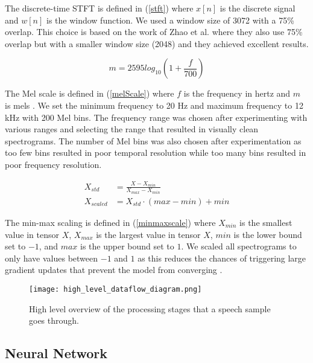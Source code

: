 The discrete-time STFT is defined in (\ref{stft}) where $x[n]$ is the discrete signal and $w[n]$ is the window function. We used a window size of 3072 with a 75\% overlap. This choice is based on the work of Zhao et al. \cite{Zhao2019} where they also use 75\% overlap but with a smaller window size (2048) and they achieved excellent results. 

\begin{equation}
\label{melScale}
m = 2595 log_{10}(1 + \frac{f}{700})
\end{equation}

The Mel scale is defined in (\ref{melScale}) where $f$ is the frequency in hertz and $m$ is mels \cite{Oshaughnessy1990}. We set the minimum frequency to 20 Hz and maximum frequency to 12 kHz with 200 Mel bins. The frequency range was chosen after experimenting with various ranges and selecting the range that resulted in visually clean spectrograms. The number of Mel bins was also chosen after experimentation as too few bins resulted in poor temporal resolution while too many bins resulted in poor frequency resolution.

\begin{equation}
\label{minmaxscale}
\begin{aligned}
X_{std} &= \frac{X - X_{min}}{X_{max} - X_{min}}\\
X_{scaled} &= X_{std} \cdot  (max - min) + min
\end{aligned}
\end{equation}

The min-max scaling is defined in (\ref{minmaxscale}) where $X_{min}$ is the smallest value in tensor $X$, $X_{max}$ is the largest value in tensor $X$, $min$ is the lower bound set to $-1$, and $max$ is the upper bound set to $1$. We scaled all spectrograms to only have values between $-1$ and $1$ as this reduces the chances of triggering large gradient updates that prevent the model from converging \cite{Chollet2017}.

\begin{figure}
	\centering
	\hspace{6mm}
	\texttt{[image: high\_level\_dataflow\_diagram.png]}
	\caption{High level overview of the processing stages that a speech sample goes through.}
	\label{highLevelDataFlowDiagram}
\end{figure}

\subsection{Neural Network}

